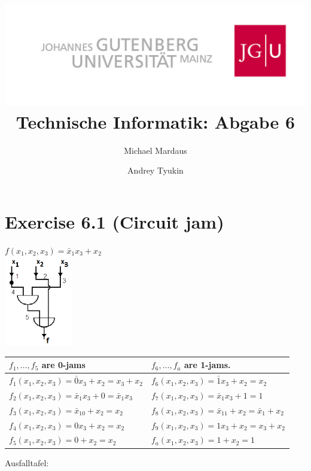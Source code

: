 \documentclass[10pt,a4paper]{scrartcl}
\author{Michael Mardaus \and Andrey Tyukin}
\title{\includegraphics[scale=0.2]{../logo_schriftzug}\\
Technische Informatik: Abgabe 6}
\begin{document}
\maketitle

\section*{Exercise 6.1 (Circuit jam)}
$f(x_1,x_2,x_3) = \bar x_1x_3+x_2$\\
\includegraphics[width=3cm]{images/circuit.png} \hspace{1.5cm}

\begin{tabular}{ll}
$f_1,\dots,f_5$ are 0-jams & $f_6,\dots,f_a$ are 1-jams.\\\hline
 $f_1(x_1,x_2,x_3) = \bar 0x_3+x_2 = x_3+x_2$ & $f_6(x_1,x_2,x_3) = \bar 1x_3+x_2 = x_2$ \\
 $f_2(x_1,x_2,x_3) = \bar x_1x_3+0 = \bar x_1x_3$ & $f_7(x_1,x_2,x_3) = \bar x_1x_3+1 = 1$ \\
 $f_3(x_1,x_2,x_3) = \bar x_10+x_2 = x_2$ & $f_8(x_1,x_2,x_3) = \bar x_11+x_2 = \bar x_1+x_2$ \\
 $f_4(x_1,x_2,x_3) =  0x_3+x_2 = x_2$ & $f_9(x_1,x_2,x_3) =  1x_3+x_2 = x_3+x_2$ \\
 $f_5(x_1,x_2,x_3) = 0+x_2 = x_2$ & $f_a(x_1,x_2,x_3) = 1+x_2 = 1$ \\
\end{tabular}

\vspace{1cm}

Ausfalltafel:
\end{document}
